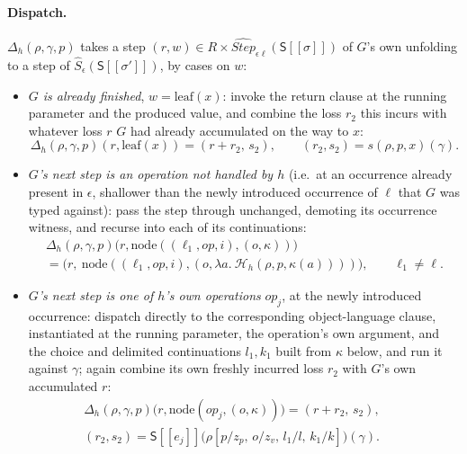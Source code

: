 \documentclass[11pt]{article}
\theoremstyle{plain}
\newcommand{\Ssem}[1]{\mathsf{S}[\![#1]\!]}
\newcommand{\Sm}[1]{\widehat{S}_{#1}}
\newcommand{\Stepm}[1]{\widehat{\mathit{Step}}_{#1}}
\newcommand{\eps}{\epsilon}
\newcommand{\op}{\mathit{op}}
\begin{document}
\paragraph{Dispatch.} $\Delta_h(\rho,\gamma,p)$ takes a step $(r,w)\in R\times
\Stepm{\eps\ell}(\Ssem\sigma)$ of $G$'s own unfolding to a step of $\Sm\eps(\Ssem{\sigma'})$,
by cases on $w$:
\begin{itemize}
\item \emph{$G$ is already finished}, $w=\mathrm{leaf}(x)$: invoke the return clause at the
  running parameter and the produced value, and combine the loss $r_2$ this incurs with
  whatever loss $r$ $G$ had already accumulated on the way to $x$:
  \[
    \Delta_h(\rho,\gamma,p)(r,\mathrm{leaf}(x)) = (r+r_2,\,s_2), \qquad (r_2,s_2) = s(\rho,p,x)(\gamma).
  \]
\item \emph{$G$'s next step is an operation not handled by $h$} (i.e.\ at an occurrence
  already present in $\eps$, shallower than the newly introduced occurrence of $\ell$ that
  $G$ was typed against): pass the step through unchanged, demoting its occurrence witness,
  and recurse into each of its continuations:
  \begin{multline*}
    \Delta_h(\rho,\gamma,p)\big(r,\mathrm{node}((\ell_1,\op,i),(o,\kappa))\big) \\
      = \big(r,\ \mathrm{node}((\ell_1,\op,i),(o,\lambda a.\ \mathcal H_h(\rho,p,\kappa(a))))\big), \qquad \ell_1\ne \ell.
  \end{multline*}
\item \emph{$G$'s next step is one of $h$'s own operations} $\op_j$, at the newly
  introduced occurrence: dispatch directly to the corresponding object-language clause,
  instantiated at the running parameter, the operation's own argument, and the choice and
  delimited continuations $l_1,k_1$ built from $\kappa$ below, and run it against $\gamma$;
  again combine its own freshly incurred loss $r_2$ with $G$'s own accumulated $r$:
  \begin{multline*}
    \Delta_h(\rho,\gamma,p)\big(r,\mathrm{node}(\op_j,(o,\kappa))\big) = (r+r_2,\,s_2), \qquad \\
    (r_2,s_2) = \Ssem{e_j}\big(\rho[p/z_p,\,o/z_v,\,l_1/l,\,k_1/k]\big)(\gamma).
  \end{multline*}
\end{itemize}
\end{document}
